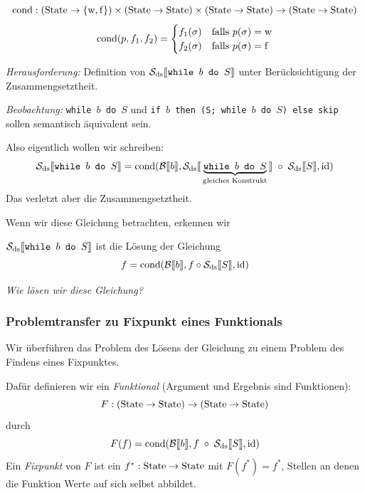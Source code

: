 \begin{definition}[cond] \label{def:cond}
    \[
        \cond : (\State \to \bool) \times (\State \to \State) \times (\State \to \State) \to (\State \to \State)
    \]
    \[
        \cond(p, f_1, f_2) = \begin{cases}
            f_1(\sigma) & \text{falls } p(\sigma) = \true \\
            f_2(\sigma) & \text{falls } p(\sigma) = \false
        \end{cases}
    \]
\end{definition}

\par\bigskip
\emph{Herausforderung:} Definition von $\Sdssem{\texttt{while $b$ do $S$}}$ unter Berücksichtigung der Zusammengsetztheit.

\emph{Beobachtung:} \texttt{while $b$ do $S$} und \texttt{if $b$ then (S; while $b$ do $S$) else skip} sollen semantisch äquivalent sein.

Also eigentlich wollen wir schreiben: \[
    \Sdssem{\texttt{while $b$ do $S$}} = \cond(\Bsem{b}, \Sdssem{\underbrace{\texttt{while $b$ do $S$}}_{\text{gleiches Konstrukt}}} \;\circ\; \Sdssem{S}, \id)
\]
Das verletzt aber die Zusammengsetztheit.

\par\medskip
Wenn wir diese Gleichung betrachten, erkennen wir
\begin{remark}[Erkenntnis]
    $\Sdssem{\texttt{while $b$ do $S$}}$ ist die Lösung der Gleichung \[
        f = \cond(\Bsem{b}, f \circ \Sdssem{S}, \id)
    \]
\end{remark}

\emph{Wie lösen wir diese Gleichung?}



\subsubsection{Problemtransfer zu Fixpunkt eines Funktionals}

Wir überführen das Problem des Lösens der Gleichung zu einem Problem des Findens eines Fixpunktes.

\begin{definition}[Funktional] \label{def:funktional}
    Dafür definieren wir ein \emph{Funktional} (Argument und Ergebnis sind Funktionen): \[
        F : (\State \to \State) \to (\State \to \State)
    \] durch \[
        F(f) = \cond(\Bsem{b}, f \;\circ\; \Sdssem{S}, \id)
    \]
    Ein \emph{Fixpunkt} von $F$ ist ein $f^* : \State \to \State$ mit $F(f^*) = f^*$, \dh{} Stellen an denen die Funktion Werte auf sich selbst abbildet.
\end{definition}

